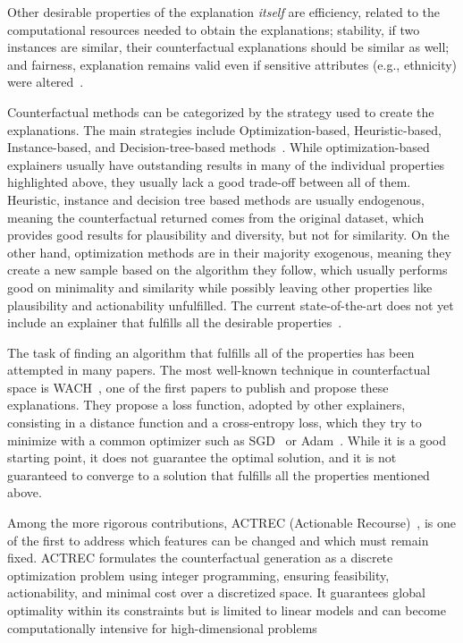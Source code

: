 \documentclass[12pt]{extarticle}
\numberwithin{equation}{section}
\begin{document}
Other desirable properties of the explanation \emph{itself} are efficiency, related to the computational resources needed to obtain the explanations; stability, if two instances are similar, their counterfactual explanations should be similar as well; and fairness, explanation remains valid even if sensitive attributes (e.g., ethnicity) were altered~\cite{guidotti2024counterfactual}.

Counterfactual methods can be categorized by the strategy used to create the explanations. The main strategies include Optimization-based, Heuristic-based, Instance-based, and Decision-tree-based methods~\cite{guidotti2024counterfactual}. While optimization-based explainers usually have outstanding results in many of the individual properties highlighted above, they usually lack a good trade-off between all of them. Heuristic, instance and decision tree based methods are usually endogenous, meaning the counterfactual returned comes from the original dataset, which provides good results for plausibility and diversity, but not for similarity. On the other hand, optimization methods are in their majority exogenous, meaning they create a new sample based on the algorithm they follow, which usually performs good on minimality and similarity while possibly leaving other properties like plausibility and actionability unfulfilled. The current state-of-the-art does not yet include an explainer that fulfills all the desirable properties~\cite{guidotti2024counterfactual}.

The task of finding an algorithm that fulfills all of the properties has been attempted in many papers. The most well-known technique in counterfactual space is WACH~\cite{wachter2017counterfactual}, one of the first papers to publish and propose these explanations. They propose a loss function, adopted by other explainers, consisting in a distance function and a cross-entropy loss, which they try to minimize with a common optimizer such as SGD~\cite{sgd} or Adam~\cite{adam}. While it is a good starting point, it does not guarantee the optimal solution, and it is not guaranteed to converge to a solution that fulfills all the properties mentioned above.

Among the more rigorous contributions, ACTREC (Actionable Recourse)~\cite{ustun2019actionable}, is one of the first to address which features can be changed and which must remain fixed. ACTREC formulates the counterfactual generation as a discrete optimization problem using integer programming, ensuring feasibility, actionability, and minimal cost over a discretized space. It guarantees global optimality within its constraints but is limited to linear models and can become computationally intensive for high-dimensional problems
\end{document}
